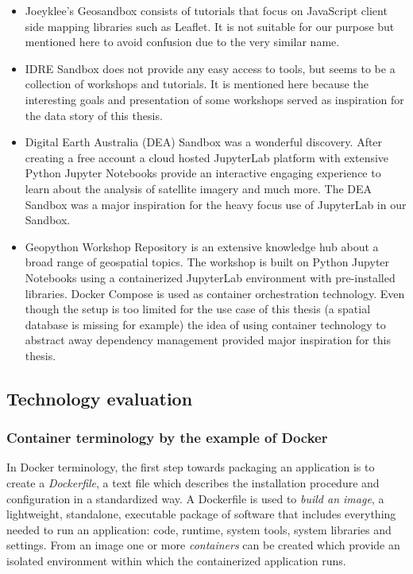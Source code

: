\documentclass[11pt, a4paper, oneside, parskip=full-]{scrartcl}
\begin{document}
\begin{itemize}
  \item Joeyklee's Geosandbox\cite{project-joeyklee} consists of tutorials that
  focus on JavaScript client side mapping libraries such as Leaflet. It is not
  suitable for our purpose but mentioned here to avoid confusion due to the very
  similar name.
  \item IDRE Sandbox\cite{project-idre} does not provide any easy access to
  tools, but seems to be a collection of workshops and tutorials. It is
  mentioned here because the interesting goals and presentation of some
  workshops served as inspiration for the data story of this thesis.
  \item Digital Earth Australia (DEA) Sandbox\cite{project-dea} was a wonderful
  discovery. After creating a free account a cloud hosted
  JupyterLab\cite{jupyterlab} platform with extensive Python Jupyter Notebooks
  provide an interactive engaging experience to learn about the analysis of
  satellite imagery and much more. The DEA Sandbox was a major inspiration for
  the heavy focus use of JupyterLab in our Sandbox.
  \item Geopython Workshop Repository\cite{project-geopython} is an extensive
  knowledge hub about a broad range of geospatial topics. The workshop is built
  on Python Jupyter Notebooks using a containerized JupyterLab environment with
  pre-installed libraries. Docker Compose\cite{dockercompose} is used as
  container orchestration technology. Even though the setup is too limited for
  the use case of this thesis (a spatial database is missing for example) the
  idea of using container technology to abstract away dependency management
  provided major inspiration for this thesis.
\end{itemize}

\subsection{Technology evaluation}

\subsubsection{Container terminology by the example of Docker}

In Docker terminology, the first step towards packaging an application is to
create a \emph{Dockerfile}, a text file which describes the installation
procedure and configuration in a standardized way. A Dockerfile is used to
\emph{build an image}, a lightweight, standalone, executable package of software
that includes everything needed to run an application: code, runtime, system
tools, system libraries and settings\cite{dockerimage}. From an image one or
more \emph{containers} can be created which provide an isolated environment
within which the containerized application runs.
\end{document}
